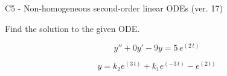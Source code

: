 \begin{exercise}
  \begin{exerciseTitle}C5 - Non-homogeneous second-order linear ODEs (ver. 17)\end{exerciseTitle}
  \begin{exerciseStatement}
    
Find the solution to the given ODE.

    
\[y''+0y'-9y = 5 \, e^{\left(2 \, t\right)}\]

  \end{exerciseStatement}
  \begin{exerciseAnswer}
    
\[y= k_{2} e^{\left(3 \, t\right)} + k_{1} e^{\left(-3 \, t\right)} - e^{\left(2 \, t\right)}\]

  \end{exerciseAnswer}
\end{exercise}